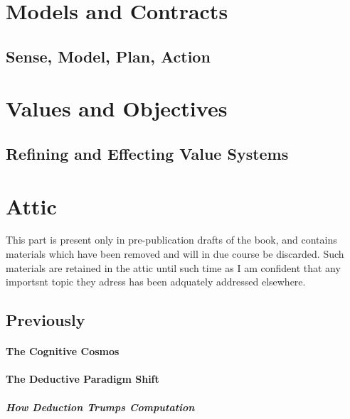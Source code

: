 \part{Models and Contracts}\label{models-and-contracts}

\chapter{Sense, Model, Plan, Action}\label{}


\part{Values and Objectives}\label{values-and-objectives}

\chapter{Refining and Effecting Value Systems}\label{refining-and-effecting-value-systems}


\part{Attic}

This part is present only in pre-publication drafts of the book, and contains materials which have been removed and will in due course be discarded.
Such materials are retained in the attic until such time as I am confident that any importsnt topic they adress has been adquately addressed elsewhere.

\chapter{Previously}\label{previously}
\subsection{The Cognitive Cosmos}\label{the-cognitive-cosmos}

\subsection{The Deductive Paradigm Shift}\label{the-deductive-paradigm-shift}

\subsubsection{How Deduction Trumps Computation}\label{how-deduction-trumps-computation}

